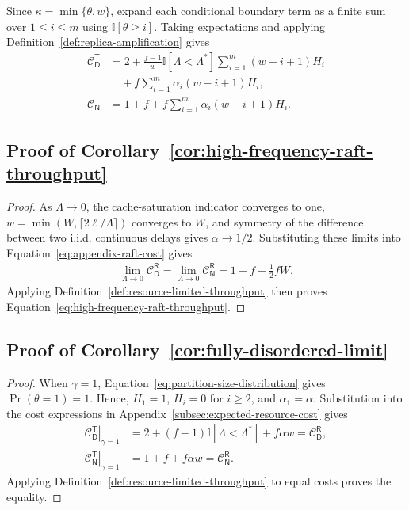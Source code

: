 Since $\kappa=\min\{\theta,w\}$, expand each conditional boundary term
as a finite sum over $1\leq i\leq m$ using
$\mathbb{I}[\theta\geq i]$. Taking expectations and applying
Definition~\ref{def:replica-amplification} gives
\begin{align}
\mathcal{C}_{\mathsf{D}}^{\mathsf{T}}
&=2+\frac{f-1}{w}\mathbb{I}[\Lambda<\Lambda^*]
\sum_{i=1}^{m}(w-i+1)H_i\nonumber\\
&\quad+f\sum_{i=1}^{m}\alpha_i(w-i+1)H_i,\nonumber\\
\mathcal{C}_{\mathsf{N}}^{\mathsf{T}}
&=1+f+f\sum_{i=1}^{m}\alpha_i(w-i+1)H_i.
\label{eq:appendix-traft-cost}
\end{align}

\subsection{Proof of Corollary~\ref{cor:high-frequency-raft-throughput}}
\begin{proof}
As $\Lambda\to0$, the cache-saturation indicator converges to one,
$w=\min(W,\lceil2\ell/\Lambda\rceil)$ converges to $W$, and symmetry of the
difference between two i.i.d. continuous delays gives $\alpha\to1/2$.
Substituting these limits into Equation~\ref{eq:appendix-raft-cost} gives
\begin{align*}
\lim_{\Lambda\to0}\mathcal{C}_{\mathsf{D}}^{\mathsf{R}}
=\lim_{\Lambda\to0}\mathcal{C}_{\mathsf{N}}^{\mathsf{R}}
=1+f+\frac{1}{2}fW.
\end{align*}
Applying Definition~\ref{def:resource-limited-throughput} then proves
Equation~\ref{eq:high-frequency-raft-throughput}.
\end{proof}

\subsection{Proof of Corollary~\ref{cor:fully-disordered-limit}}
\begin{proof}
When $\gamma=1$, Equation~\ref{eq:partition-size-distribution} gives
$\Pr(\theta=1)=1$. Hence, $H_1=1$, $H_i=0$ for $i\geq2$, and
$\alpha_1=\alpha$. Substitution into
the cost expressions in Appendix~\ref{subsec:expected-resource-cost} gives
\begin{align*}
\left.\mathcal{C}_{\mathsf{D}}^{\mathsf{T}}\right|_{\gamma=1}
&=2+(f-1)\mathbb{I}[\Lambda<\Lambda^*]+f\alpha w
=\mathcal{C}_{\mathsf{D}}^{\mathsf{R}},\\
\left.\mathcal{C}_{\mathsf{N}}^{\mathsf{T}}\right|_{\gamma=1}
&=1+f+f\alpha w
=\mathcal{C}_{\mathsf{N}}^{\mathsf{R}}.
\end{align*}
Applying Definition~\ref{def:resource-limited-throughput} to equal costs
proves the equality.
\end{proof}

